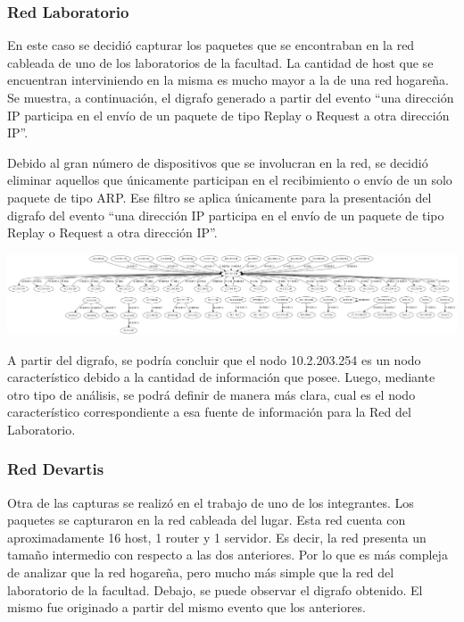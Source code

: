 \subsubsection{Red Laboratorio}
En este caso se decidió capturar los paquetes que se encontraban en la red cableada de uno de los laboratorios de la facultad. La cantidad de host que se encuentran interviniendo en la misma es mucho mayor a la de una red hogareña. Se muestra, a continuación, el digrafo generado a partir del evento ``una dirección IP participa en el envío de un paquete de tipo Replay o Request a otra dirección IP''. 

Debido al gran número de dispositivos que se involucran en la red, se decidió eliminar aquellos que únicamente participan en el recibimiento o envío de un solo paquete de tipo ARP. Ese filtro se aplica únicamente para la presentación del digrafo del evento ``una dirección IP participa en el envío de un paquete de tipo Replay o Request a otra dirección IP''.

\begin{center}
\includegraphics[angle=90, scale=0.28]{./graficos/grafos-arp/grafo_labo5.png}
\end{center}

A partir del digrafo, se podría concluir que el nodo 10.2.203.254 es un nodo característico debido a la cantidad de información que posee. Luego, mediante otro tipo de análisis, se podrá definir de manera más clara, cual es el nodo característico correspondiente a esa fuente de información para la Red del Laboratorio. 

\subsubsection{Red Devartis}
Otra de las capturas se realizó en el trabajo de uno de los integrantes. Los paquetes se capturaron en la red cableada del lugar. Esta red cuenta con aproximadamente 16 host, 1 router y 1 servidor. Es decir, la red presenta un tamaño intermedio con respecto a las dos anteriores. Por lo que es más compleja de analizar que la red hogareña, pero mucho más simple que la red del laboratorio de la facultad. 
Debajo, se puede observar el digrafo obtenido. El mismo fue originado a partir del mismo evento que los anteriores. 

